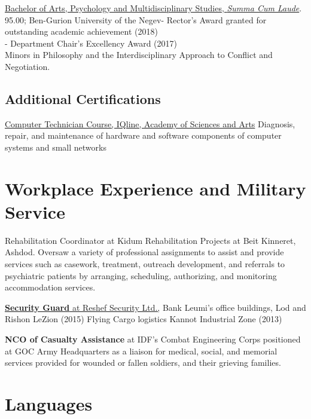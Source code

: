 {\href{https://www.dropbox.com/s/pcm0mybvgi85ma0/BA-Psych.pdf?dl=0}{Bachelor of Arts, Psychology and Multidisciplinary Studies, \textit{Summa Cum Laude}}. 95.00; Ben-Gurion University of the Negev}{- Rector's Award granted for outstanding academic achievement (2018) \\
- Department Chair’s Excellency Award (2017) \\
Minors in Philosophy and the Interdisciplinary Approach to Conflict and Negotiation.}

\subsection{Additional Certifications}
{\href{https://www.dropbox.com/s/csphxdynjdg3ze2/computer-technitian-certificate.jpg?dl=0}{Computer Technician Course, IQline, Academy of Sciences and Arts}}
{Diagnosis, repair, and maintenance of hardware and software components of computer systems and small networks}
{}

\section{Workplace Experience and Military Service}

{Rehabilitation Coordinator at Kidum Rehabilitation Projects at Beit Kinneret, Ashdod.}
{Oversaw a variety of professional assignments to assist and provide services such as casework, treatment, outreach development, and referrals to psychiatric patients by arranging, scheduling, authorizing, and monitoring accommodation services.}
{}

{\href{https://www.dropbox.com/s/kr5rcui1zgp35i0/recommendation-letter-security-guard.jpg?dl=0}{\textbf{Security Guard} at Reshef Security Ltd.,}} 
{{Bank Leumi's office buildings, Lod and Rishon LeZion (2015)
Flying Cargo logistics Kannot Industrial Zone (2013)}}
{}

{\textbf{NCO of Casualty Assistance} at IDF's Combat Engineering Corps} 
{positioned at GOC Army Headquarters as a liaison for medical, social, and memorial services provided for wounded or fallen soldiers, and their grieving families.}
{}

\section{Languages}

